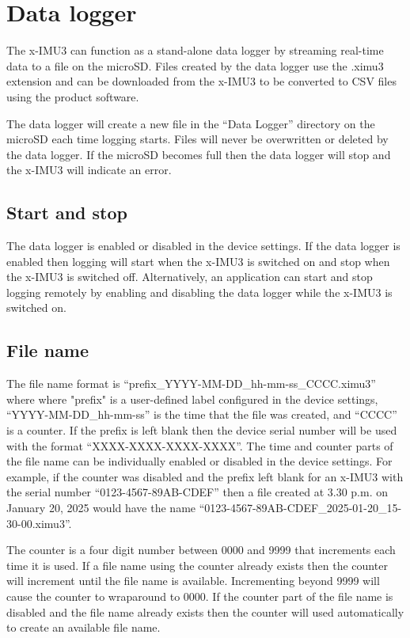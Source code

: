 \section{Data logger}
\label{sec:dataLogger}

The x-IMU3 can function as a stand-alone data logger by streaming real-time data to a file on the \ac{microSD}.  Files created by the data logger use the .ximu3 extension and can be downloaded from the x-IMU3 to be converted to \ac{CSV} files using the product software.

The data logger will create a new file in the \enquote{Data Logger} directory on the \ac{microSD} each time logging starts.  Files will never be overwritten or deleted by the data logger.  If the \ac{microSD} becomes full then the data logger will stop and the x-IMU3 will indicate an error.

\subsection{Start and stop}

The data logger is enabled or disabled in the device settings.  If the data logger is enabled then logging will start when the x-IMU3 is switched on and stop when the x-IMU3 is switched off.  Alternatively, an application can start and stop logging remotely by enabling and disabling the data logger while the x-IMU3 is switched on.

\subsection{File name}
\label{sec:fileName}

The file name format is \enquote{prefix\_YYYY-MM-DD\_hh-mm-ss\_CCCC.ximu3} where where "prefix" is a user-defined label configured in the device settings, \enquote{YYYY-MM-DD\_hh-mm-ss} is the time that the file was created, and \enquote{CCCC} is a counter.  If the prefix is left blank then the device serial number will be used with the format \enquote{XXXX-XXXX-XXXX-XXXX}.  The time and counter parts of the file name can be individually enabled or disabled in the device settings.  For example, if the counter was disabled and the prefix left blank for an x-IMU3 with the serial number \enquote{0123-4567-89AB-CDEF} then a file created at 3.30 p.m. on January 20, 2025 would have the name \enquote{0123-4567-89AB-CDEF\_2025-01-20\_15-30-00.ximu3}.

The counter is a four digit number between 0000 and 9999 that increments each time it is used.  If a file name using the counter already exists then the counter will increment until the file name is available.  Incrementing beyond 9999 will cause the counter to wraparound to 0000.  If the counter part of the file name is disabled and the file name already exists then the counter will used automatically to create an available file name.

